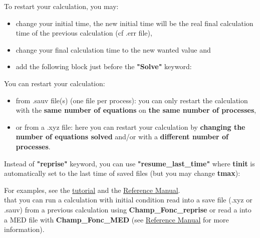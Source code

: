 To restart your calculation, you may:
\begin{itemize}
\item change your initial time, the new initial time will be the real final calculation time of the previous calculation (cf .err file),
\item change your final calculation time to the new wanted value and
\item add the following block just before the \textbf{"Solve"} keyword:
    \begin{center}
    \end{center}
\end{itemize}
\vspace{0.5cm}

You can restart your calculation:
\begin{itemize}
\item from .sauv file(s) (one file per process): you can only restart the calculation with the \textbf{same number of equations} on \textbf{the same number of processes},
\item or from a .xyz file: here you can restart your calculation by \textbf{changing the number of equations solved} and/or with a \textbf{different number of processes}.
\end{itemize}

Instead of \textbf{"reprise"} keyword, you can use \textbf{"resume\_last\_time"} where \textbf{tinit} is automatically set to the last time of saved files (but you may change \textbf{tmax}):
    \begin{center}
    \end{center}

For examples, see the \href{TRUST_tutorial.pdf\#save_restart}{tutorial} and the \href{TRUST_Reference_Manual.pdf\#Pbbase}{\trust Reference Manual}.\\

\Note that you can run a calculation with initial condition read into a save file (.xyz or .sauv) from a previous calculation using \textbf{Champ\_Fonc\_reprise} or read a into a MED file with \textbf{Champ\_Fonc\_MED} (see \href{TRUST_Reference_Manual.pdf\#champfoncmed}{\trust Reference Manual} for more information).






